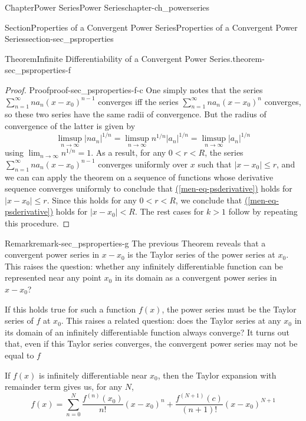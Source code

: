\documentclass[oneside,10pt,]{book}
\newcommand{\xreffont}{\relax}
\numberwithin{equation}{section}
\newcommand{\lt}{<}
\newcommand{\gt}{>}
\begin{document}
\begin{chapterptx}{Chapter}{Power Series}{}{Power Series}{}{}{chapter-ch_powerseries}
\begin{sectionptx}{Section}{Properties of a Convergent Power Series}{}{Properties of a Convergent Power Series}{}{}{section-sec_psproperties}
\begin{theorem}{Theorem}{Infinite Differentiability of a Convergent Power Series.}{}{theorem-sec_psproperties-f}
\end{theorem}
\begin{proof}{Proof}{}{proof-sec_psproperties-f-c}
One simply notes that the series \(\sum_{n=1}^{\infty} n a_{n}(x-x_{0})^{n-1}\) converges iff the series \(\sum_{n=1}^{\infty} n a_{n}(x-x_{0})^{n}\) converges, so these two series have the same radii of convergence. But the radius of convergence of  the latter is given by%
\begin{equation*}
\limsup_{n\to\infty} \vert n a_{n} \vert^{1/n}=
\limsup_{n\to\infty} n^{1/n} \vert a_{n}\vert^{1/n}=   \limsup_{n\to\infty}
\vert  a_{n}\vert^{1/n}
\end{equation*}
using \(\lim_{n\to \infty}  n^{1/n}=1\). As a result, for any \(0\lt r \lt R\), the series \(\sum_{n=1}^{\infty} n a_{n}(x-x_{0})^{n-1}\)  converges uniformly over \(x\) such that \(\vert x-x_{0}\vert \le r\), and we can can apply the theorem on a sequence of functions whose derivative sequence converges uniformly to conclude that \hyperref[men-eq-psderivative]{({\xreffont\ref{men-eq-psderivative}})} holds for \(\vert x-x_{0}\vert \le r\). Since this holds for any  \(0\lt r \lt R\), we conclude that \hyperref[men-eq-psderivative]{({\xreffont\ref{men-eq-psderivative}})} holds for \(\vert x-x_{0}\vert \lt R\). The rest cases for \(k\gt 1\) follow by repeating this procedure.\end{proof}
\begin{remark}{Remark}{}{remark-sec_psproperties-g}%
The previous Theorem reveals that a convergent power series in \(x-x_{0}\) is the Taylor series of the power series at \(x_{0}\). This raises the question: whether any infinitely differentiable function can be represented near any point \(x_{0}\) in its domain as a convergent power series in \(x-x_{0}\)?%
\par
If this holds true for such a function \(f(x)\), the power series must be the Taylor series of \(f\) at \(x_{0}\). This raises a related question: does the Taylor series at any \(x_{0}\) in its domain of an infinitely differentiable function always converge? It turns out that, even if this Taylor series converges, the convergent power series may not be equal to \(f\)%
\par
If \(f(x)\) is infinitely differentiable near \(x_{0}\), then the Taylor expansion with remainder term gives us, for any \(N\),%
\begin{equation*}
f(x)=\sum_{n=0}^{N} \frac{f^{(n)}(x_{0})}{n!}(x-x_{0})^{n} +\frac{f^{(N+1)}(c)}{(n+1)!}(x-x_{0})^{N+1}
\end{equation*}

\end{remark}
\end{sectionptx}
\end{chapterptx}
\end{document}
